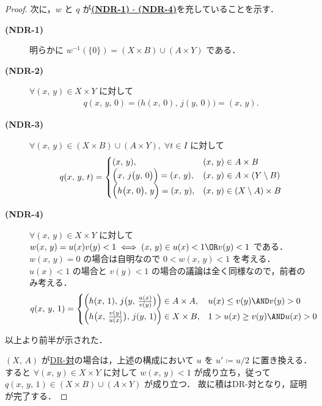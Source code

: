\documentclass[algtopo_main]{subfiles}
\begin{document}
\begin{proof}
    次に，$w$ と $q$ が\hyperref[def:NDR]{\textbf{\textsf{(NDR-1)}} - \textbf{\textsf{(NDR-4)}}}を充していることを示す．
    \begin{description}
        \item[\textbf{(NDR-1)}] 明らかに $w^{-1} (\{0\}) = (X \times B) \cup (A \times Y)$ である．
        \item[\textbf{(NDR-2)}] $\forall (x,\, y) \in X \times Y$ に対して
        \begin{align}
            q(x,\, y,\, 0) = \bigl(h(x,\, 0),\, j(y,\, 0)\bigr) = (x,\, y).
        \end{align}
        \item[\textbf{(NDR-3)}] $\forall (x,\, y) \in (X \times B) \cup (A \times Y),\; \forall t \in I$ に対して
        \begin{align}
            q(x,\, y,\, t) = 
            \begin{cases}
                (x,\, y), &(x,\, y) \in A \times B \\
                \Bigl( x,\, j \bigl(y,\, 0 \bigr)  \Bigr) = (x,\, y), &(x,\, y) \in A \times (Y\setminus B) \\
                \Bigl( h \bigl( x,\, 0 \bigr),\, y  \Bigr) = (x,\, y), &(x,\, y) \in (X \setminus A) \times B
            \end{cases}
        \end{align}
        \item[\textbf{(NDR-4)}] $\forall (x,\, y) \in X \times Y$ に対して $w(x,\, y) = u(x)v(y) < 1 \iff (x,\, y) \in u(x) < 1 \OR v(y) < 1 $ である．
        $w(x,\, y) = 0$ の場合は自明なので $0 < w(x,\, y) < 1$ を考える．
        $u(x) < 1$ の場合と $v(y) < 1$ の場合の議論は全く同様なので，前者のみ考える．
        \begin{align}
            q(x,\, y,\, 1) = 
            \begin{cases}
                \Bigl( h(x,\, 1),\, j \bigl(y,\, \frac{u(x)}{v(y)} \bigr)  \Bigr) \in A \times A, &u(x) \le v(y) \AND v(y) > 0 \\
                \Bigl( h \bigl( x,\, \frac{v(y)}{u(x)} \bigr),\, j(y,\, 1)  \Bigr) \in X \times B, &1 > u(x) \ge v(y) \AND u(x) > 0
            \end{cases}
        \end{align}
    \end{description}
    以上より前半が示された．

    $(X,\, A)$ が\hyperref[def:NDR]{DR-対}の場合は，上述の構成において $u$ を $u' \coloneqq u/2$ に置き換える．すると $\forall (x,\, y) \in X \times Y$ に対して $w(x,\, y) < 1$ が成り立ち，従って $q(x,\, y,\, 1) \in (X \times B) \cup (A \times Y)$ が成り立つ．
    故に積はDR-対となり，証明が完了する．
\end{proof}
\end{document}
